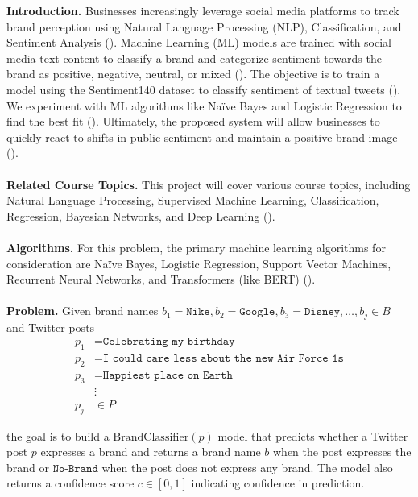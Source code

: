 \documentclass{article}
\begin{document}
\textbf{Introduction.} Businesses increasingly leverage social media platforms to track brand perception using Natural Language Processing (NLP), Classification, and Sentiment Analysis (\cite{colleoni2011measuring, benedetto2016big}). Machine Learning (ML) models are trained with social media text content to classify a brand and categorize sentiment towards the brand as positive, negative, neutral, or mixed (\cite{alessia2015approaches, anupama2020real, vidya2015twitter}). The objective is to train a model using the Sentiment140 dataset to classify sentiment of textual tweets (\cite{go2009twitter, pak2010twitter}). We experiment with ML algorithms like Naïve Bayes and Logistic Regression to find the best fit (\cite{howard2018universal}). Ultimately, the proposed system will allow businesses to quickly react to shifts in public sentiment and maintain a positive brand image (\cite{vidya2015twitter, petasis2013large, ducange2019effective}). \\
\\
\textbf{Related Course Topics.} This project will cover various course topics, including Natural Language Processing, Supervised Machine Learning, Classification, Regression, Bayesian Networks, and Deep Learning (\cite{severyn2015twitter, liu2020aspect, socher2013recursive}).\\
\\
\textbf{Algorithms.} For this problem, the primary machine learning algorithms for consideration are Naïve Bayes, Logistic Regression, Support Vector Machines, Recurrent Neural Networks, and Transformers (like BERT) (\cite{DBLP:journals/corr/abs-1810-04805}).\\
\\
\textbf{Problem.} Given brand names $b_1 = \texttt{Nike}, b_2 = \texttt{Google}, b_3 = \texttt{Disney}, \dots, b_j \in B$ and Twitter posts
\begin{align*}
    p_1 & = \texttt{Celebrating my birthday}                      \\
    p_2 & = \texttt{I could care less about the new Air Force 1s} \\
    p_3 & = \texttt{Happiest place on Earth}                      \\
        & \vdots                                                  \\
    p_j & \in P
\end{align*}

the goal is to build a $\mathrm{BrandClassifier}(p)$ model that predicts whether a Twitter post $p$ expresses a brand and returns a brand name $b$ when the post expresses the brand or $\texttt{No-Brand}$ when the post does not express any brand. The model also returns a confidence score $c \in [0, 1]$ indicating confidence in prediction.
\end{document}
